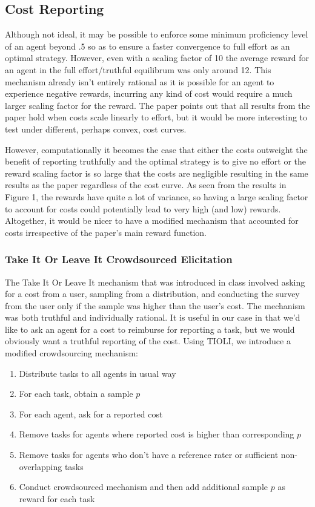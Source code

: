 \documentclass{scrartcl}
\begin{document}
\subsection{Cost Reporting}

Although not ideal, it may be possible to enforce some minimum proficiency level of an agent beyond .5 so as to ensure a faster convergence to full effort as an optimal strategy. However, even with a scaling factor of 10 the average reward for an agent in the full effort/truthful equilibrum was only around 12. This mechanism already isn't entirely rational as it is possible for an agent to experience negative rewards, incurring any kind of cost would require a much larger scaling factor for the reward. The paper points out that all results from the paper hold when costs scale linearly to effort, but it would be more interesting to test under different, perhaps convex, cost curves. 

However, computationally it becomes the case that either the costs outweight the benefit of reporting truthfully and the optimal strategy is to give no effort or the reward scaling factor is so large that the costs are negligible resulting in the same results as the paper regardless of the cost curve. As seen from the results in Figure 1, the rewards have quite a lot of variance, so having a large scaling factor to account for costs could potentially lead to very high (and low) rewards. Altogether, it would be nicer to have a modified mechanism that accounted for costs irrespective of the paper's main reward function.

\subsubsection{Take It Or Leave It Crowdsourced Elicitation}
The Take It Or Leave It mechanism that was introduced in class involved asking for a cost from a user, sampling from a distribution, and conducting the survey from the user only if the sample was higher than the user's cost. The mechanism was both truthful and individually rational. It is useful in our case in that we'd like to ask an agent for a cost to reimburse for reporting a task, but we would obviously want a truthful reporting of the cost. Using TIOLI, we introduce a modified crowdsourcing mechanism:

\begin{enumerate}
	\item Distribute tasks to all agents in usual way
	\item For each task, obtain a sample $p$
	\item For each agent, ask for a reported cost
	\item Remove tasks for agents where reported cost is higher than corresponding $p$
	\item Remove tasks for agents who don't have a reference rater or sufficient non-overlapping tasks
	\item Conduct crowdsourced mechanism and then add additional sample $p$ as reward for each task
\end{enumerate}
\end{document}
